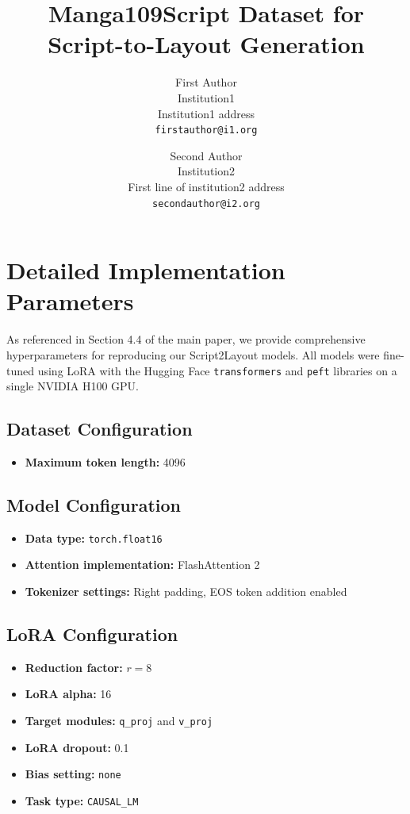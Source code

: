 \documentclass[10pt,twocolumn,letterpaper]{article}
\title{Manga109Script Dataset for Script-to-Layout Generation}
\author{First Author\\
Institution1\\
Institution1 address\\
{\tt\small firstauthor@i1.org}
\and
Second Author\\
Institution2\\
First line of institution2 address\\
{\tt\small secondauthor@i2.org}
}
\begin{document}
\maketitlesupplementary
\renewcommand{\thesection}{\Alph{section}}
\renewcommand{\thesubsection}{\thesection.\arabic{subsection}}

\section{Detailed Implementation Parameters}

As referenced in Section 4.4 of the main paper, we provide comprehensive hyperparameters for reproducing our Script2Layout models. All models were fine-tuned using LoRA with the Hugging Face \texttt{transformers} and \texttt{peft} libraries on a single NVIDIA H100 GPU.

\subsection{Dataset Configuration}

\begin{itemize}
    \item \textbf{Maximum token length:} 4096
\end{itemize}

\subsection{Model Configuration}

\begin{itemize}
    \item \textbf{Data type:} \texttt{torch.float16}
    \item \textbf{Attention implementation:} FlashAttention 2
    \item \textbf{Tokenizer settings:} Right padding, EOS token addition enabled
\end{itemize}

\subsection{LoRA Configuration}

\begin{itemize}
    \item \textbf{Reduction factor:} $r = 8$
    \item \textbf{LoRA alpha:} 16
    \item \textbf{Target modules:} \texttt{q\_proj} and \texttt{v\_proj}
    \item \textbf{LoRA dropout:} 0.1
    \item \textbf{Bias setting:} \texttt{none}
    \item \textbf{Task type:} \texttt{CAUSAL\_LM}
\end{itemize}
\end{document}

